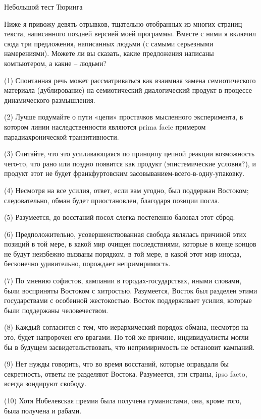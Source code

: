 \documentclass[../main.tex]{subfiles}
\begin{document}
Небольшой тест Тюринга

Ниже я привожу девять отрывков, тщательно отобранных из многих страниц текста, написанного поздней версией моей программы. Вместе с ними я включил сюда три предложения, написанных людьми (с самыми серьезными намерениями). Можете ли вы сказать, какие предложения написаны компьютером, а какие \--- людьми?

(1) Спонтанная речь может рассматриваться как взаимная замена семиотического материала (дублирование) на семиотический диалогический продукт в процессе динамического размышления.

(2) Лучше подумайте о пути «цепи» простачков мысленного эксперимента, в котором линии наследственности являются prima facie примером парадиахронической транзитивности.

(3) Считайте, что это усиливающаяся по принципу цепной реакции возможность чего-то, что рано или поздно появится как продукт (эпистемические условия?), и продукт этот не будет франкфуртовским засовыванием-всего-в-одну-упаковку.

(4) Несмотря на все усилия, ответ, если вам угодно, был поддержан Востоком; следовательно, обман будет приостановлен, благодаря позиции посла.

(5) Разумеется, до восстаний посол слегка постепенно баловал этот сброд.

(6) Предположительно, усовершенствованная свобода являлась причиной этих позиций в той мере, в какой мир очищен последствиями, которые в конце концов не будут неизбежно вызваны порядком, в той мере, в какой этот мир иногда, бесконечно удивительно, порождает непримиримость.

(7) По мнению софистов, кампании в городах-государствах, иными словами, были восприняты Востоком с хитростью. Разумеется, Восток был разделен этими государствами с особенной жестокостью. Восток поддерживает усилия, которые были поддержаны человечеством.

(8) Каждый согласится с тем, что иерархический порядок обмана, несмотря на это, будет напророчен его врагами. По той же причине, индивидуалисты могли бы в будущем засвидетельствовать, что непримиримость не остановит кампаний.

(9) Нет нужды говорить, что во время восстаний, которые оправдали бы секретность, ответы не разделяют Востока. Разумеется, эти страны, ipso facto, всегда зондируют свободу.

(10) Хотя Нобелевская премия была получена гуманистами, она, кроме того, была получена и рабами.
\end{document}
